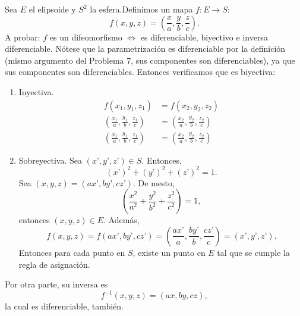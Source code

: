\begin{problema}
\begin{enumerate}
\begin{sol}
            Sea $E$ el elipsoide y $S^2$ la esfera.Definimos un mapa $f: E \rightarrow S$:  $$ f(x,y,z) = \left(\frac{x}{a},\frac{y}{b},\frac{z}{c}\right). $$ A probar: $f$ es un difeomorfismo $\iff$ es diferenciable, biyectivo e inversa diferenciable. Nótese que la parametrización es diferenciable por la definición (mismo argumento del Problema 7, sus componentes son diferenciables), ya que sus componentes son diferenciables. Entonces verificamos que es biyectiva: 
            \begin{enumerate}
                \item Inyectiva. 
                \begin{align*}
                    f(x_1,y_1,z_1) &= f(x_2,y_2,z_2)\\
                    \left(\frac{x_1}{a},\frac{y_1}{b},\frac{z_1}{c}\right) &= \left(\frac{x_2}{a},\frac{y_2}{b},\frac{z_2}{c}\right)\\
                    \left(\frac{x_1}{a},\frac{y_1}{b},\frac{z_1}{c}\right) &= \left(\frac{x_2}{a},\frac{y_2}{b},\frac{z_2}{c}\right)
                \end{align*}
                \item Sobreyectiva. Sea $(x’,y’,z’) \in S$. Entonces, $$ (x’)^2 + (y’)^2 + (z’)^2 = 1. $$ Sea $(x,y,z) = (ax’,by’,cz’)$. De mesto, $$ \left(\frac{x^2}{a^2}+\frac{y^2}{b^2}+\frac{z^2}{c^2}\right) = 1, $$ entonces $(x,y,z) \in E$. Además, $$ f(x,y,z) = f(ax’,by’,cz’) = \left(\frac{ax’}{a},\frac{by’}{b},\frac{cz’}{c}\right) = (x’,y’,z’). $$ Entonces para cada punto en $S$, existe un punto en  $E$ tal que se cumple la regla de asignación. 
            \end{enumerate}

Por otra parte, su inversa es $$ f^{-1}(x,y,z)=(ax,by,cz), $$
la cual es diferenciable, también. 

        \end{sol}
        
    \end{enumerate}
\end{problema}
%
%


